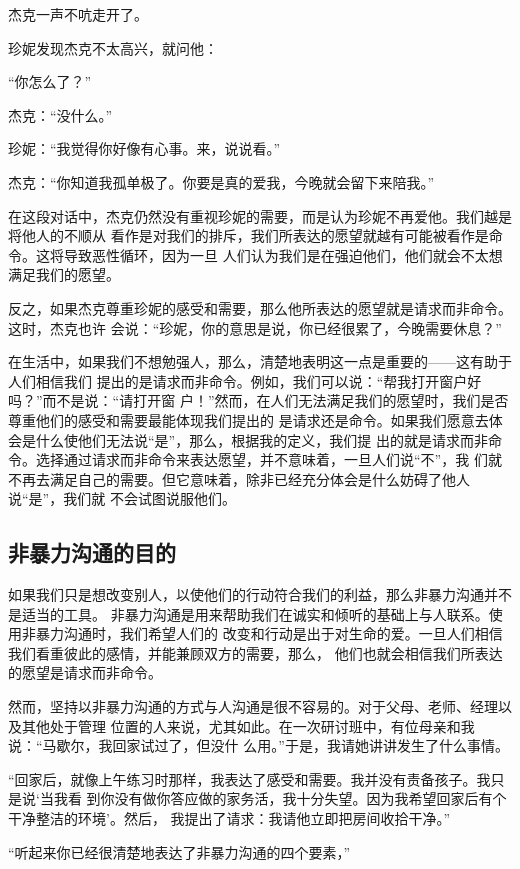 \documentclass{ctexart}
\renewenvironment{quotation}{\setlength{\parskip}{0.5em}\setstretch{1.5}\kaishu\zihao{-5}\setlength{\parindent}{1em}}{\vspace{1em}}
\begin{document}
杰克一声不吭走开了。

珍妮发现杰克不太高兴，就问他：

\begin{quotation}
	``你怎么了？''

	杰克：``没什么。''

	珍妮：``我觉得你好像有心事。来，说说看。''

	杰克：``你知道我孤单极了。你要是真的爱我，今晚就会留下来陪我。''
\end{quotation}

在这段对话中，杰克仍然没有重视珍妮的需要，而是认为珍妮不再爱他。我们越是将他人的不顺从
看作是对我们的排斥，我们所表达的愿望就越有可能被看作是命令。这将导致恶性循环，因为一旦
人们认为我们是在强迫他们，他们就会不太想满足我们的愿望。

反之，如果杰克尊重珍妮的感受和需要，那么他所表达的愿望就是请求而非命令。这时，杰克也许
会说：``珍妮，你的意思是说，你已经很累了，今晚需要休息？''

在生活中，如果我们不想勉强人，那么，清楚地表明这一点是重要的------这有助于人们相信我们
提出的是请求而非命令。例如，我们可以说：``帮我打开窗户好吗？''而不是说：``请打开窗
户！''然而，在人们无法满足我们的愿望时，我们是否尊重他们的感受和需要最能体现我们提出的
是请求还是命令。如果我们愿意去体会是什么使他们无法说``是''，那么，根据我的定义，我们提
出的就是请求而非命令。选择通过请求而非命令来表达愿望，并不意味着，一旦人们说``不''，我
们就不再去满足自己的需要。但它意味着，除非已经充分体会是什么妨碍了他人说``是''，我们就
不会试图说服他们。


\subsection{非暴力沟通的目的}

如果我们只是想改变别人，以使他们的行动符合我们的利益，那么非暴力沟通并不是适当的工具。
非暴力沟通是用来帮助我们在诚实和倾听的基础上与人联系。使用非暴力沟通时，我们希望人们的
改变和行动是出于对生命的爱。一旦人们相信我们看重彼此的感情，并能兼顾双方的需要，那么，
他们也就会相信我们所表达的愿望是请求而非命令。

然而，坚持以非暴力沟通的方式与人沟通是很不容易的。对于父母、老师、经理以及其他处于管理
位置的人来说，尤其如此。在一次研讨班中，有位母亲和我说：``马歇尔，我回家试过了，但没什
么用。''于是，我请她讲讲发生了什么事情。

\begin{quotation}
	``回家后，就像上午练习时那样，我表达了感受和需要。我并没有责备孩子。我只是说`当我看
	到你没有做你答应做的家务活，我十分失望。因为我希望回家后有个干净整洁的环境'。然后，
	我提出了请求：我请他立即把房间收拾干净。''

	``听起来你已经很清楚地表达了非暴力沟通的四个要素，''
\end{quotation}
\end{document}

